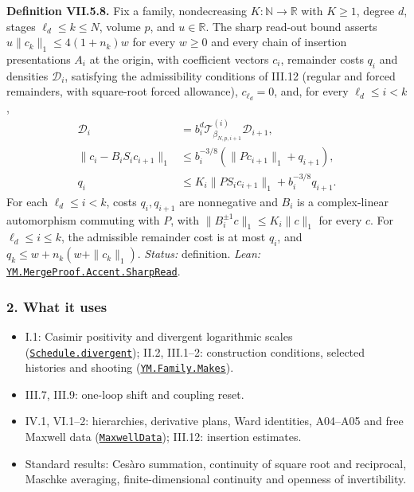 \documentclass[
  letterpaper,
  11pt]{article}
\providecommand{\tightlist}{%
  \setlength{\itemsep}{0pt}\setlength{\parskip}{0pt}}
\begin{document}
\textbf{Definition VII.5.8.} Fix a family, nondecreasing
\(K:\mathbb N\to\mathbb R\) with \(K\ge1\), degree \(d\), stages
\(\ell_d\le k\le N\), volume \(p\), and \(u\in\mathbb R\). The sharp
read-out bound asserts \(u\|c_k\|_1\le4(1+n_k)w\) for every \(w\ge0\)
and every chain of insertion presentations \(A_i\) at the origin, with
coefficient vectors \(c_i\), remainder costs \(q_i\) and densities
\(\mathcal D_i\), satisfying the admissibility conditions of III.12
(regular and forced remainders, with square-root forced allowance),
\(c_{\ell_d}=0\), and, for every \(\ell_d\le i<k\), \[\begin{aligned}
\mathcal D_i&=b_i^d\mathcal T^{(i)}_{\beta_{N,p,i+1}}\mathcal D_{i+1},\\
\|c_i-B_iS_ic_{i+1}\|_1&\le b_i^{-3/8}(\|Pc_{i+1}\|_1+q_{i+1}),\\
q_i&\le K_i\|PS_ic_{i+1}\|_1+b_i^{-3/8}q_{i+1}.
\end{aligned}\] For each \(\ell_d\le i<k\), costs \(q_i,q_{i+1}\) are
nonnegative and \(B_i\) is a complex-linear automorphism commuting with
\(P\), with \(\|B_i^{\pm1}c\|_1\le K_i\|c\|_1\) for every \(c\). For
\(\ell_d\le i\le k\), the admissible remainder cost is at most \(q_i\),
and \(q_k\le w+n_k(w+\|c_k\|_1)\). \emph{Status:} definition.
\emph{Lean:}
\href{https://github.com/yang-mills-group/OpenAI-YM-20261028/blob/3456e5e75cf8d4cd558955a5c7638fba2d68f464/YM/TraceExtension/Soot/Skein.lean\#L26}{\texttt{YM.MergeProof.Accent.SharpRead}}.

\subsubsection{2. What it uses}\label{what-it-uses-29}

\begin{itemize}
\tightlist
\item
  I.1: Casimir positivity and divergent logarithmic scales
  (\href{https://github.com/yang-mills-group/OpenAI-YM-20261028/blob/3456e5e75cf8d4cd558955a5c7638fba2d68f464/YM/Lattice/Scale.lean\#L117-L120}{\texttt{Schedule.divergent}});
  II.2, III.1--2: construction conditions, selected histories and
  shooting
  (\href{https://github.com/yang-mills-group/OpenAI-YM-20261028/blob/3456e5e75cf8d4cd558955a5c7638fba2d68f464/YM/Source/Construction.lean\#L44-L62}{\texttt{YM.Family.Makes}}).
\item
  III.7, III.9: one-loop shift and coupling reset.
\item
  IV.1, VI.1--2: hierarchies, derivative plans, Ward identities,
  A04--A05 and free Maxwell data
  (\href{https://github.com/yang-mills-group/OpenAI-YM-20261028/blob/3456e5e75cf8d4cd558955a5c7638fba2d68f464/YM/Org/Input.lean\#L159-L170}{\texttt{MaxwellData}});
  III.12: insertion estimates.
\item
  Standard results: Cesàro summation, continuity of square root and
  reciprocal, Maschke averaging, finite-dimensional continuity and
  openness of invertibility.
\end{itemize}
\end{document}
